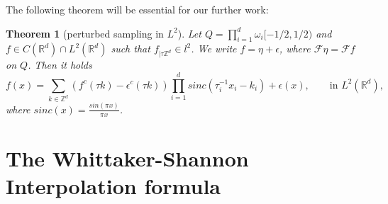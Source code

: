 \documentclass[a4paper, 11pt]{scrreprt}
\newtheorem{theorem}[defi]{Theorem}
\newcommand{\RR}{\mathbb{R}}
\newcommand{\ZZ}{\mathbb{Z}}
\newcommand{\FF}{\mathcal{F}}
\begin{document}
The following theorem will be essential for our further work:
\begin{theorem}[perturbed sampling in \(L^2\)]
\label{th:perturbed sampling}
Let \(Q = \prod_{i=1}^d \omega_i[-1/2, 1/2)\) and \\
 \({f\in C(\RR^d)\cap L^2(\RR^d)}\) such that \(f_{|\tau\ZZ^d} \in l^2\). We write \(f=\eta + \epsilon\), where \(\FF\eta = \FF f\) on \(Q\). Then it holds
\begin{equation}
	f(x) = \sum_{k\in\ZZ^d} (f^c(\tau k)-\epsilon^c(\tau k))\prod _{i=1}^d sinc(\tau_i^{-1}x_i-k_i)+\epsilon(x), \qquad \text{in } L^2(\RR^d),
\end{equation}
where \(sinc(x) = \frac{sin(\pi x)}{\pi x}\).
\end{theorem}

\newpage
\section{The Whittaker-Shannon Interpolation formula}
\end{document}
